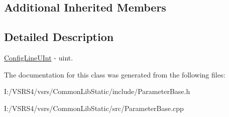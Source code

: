 \subsection*{Additional Inherited Members}


\subsection{Detailed Description}
\hyperlink{class_config_line_u_int}{Config\+Line\+U\+Int} -\/ uint. 

The documentation for this class was generated from the following files\+:\begin{DoxyCompactItemize}
\item 
I\+:/\+V\+S\+R\+S4/vsrs/\+Common\+Lib\+Static/include/Parameter\+Base.\+h\item 
I\+:/\+V\+S\+R\+S4/vsrs/\+Common\+Lib\+Static/src/Parameter\+Base.\+cpp\end{DoxyCompactItemize}
